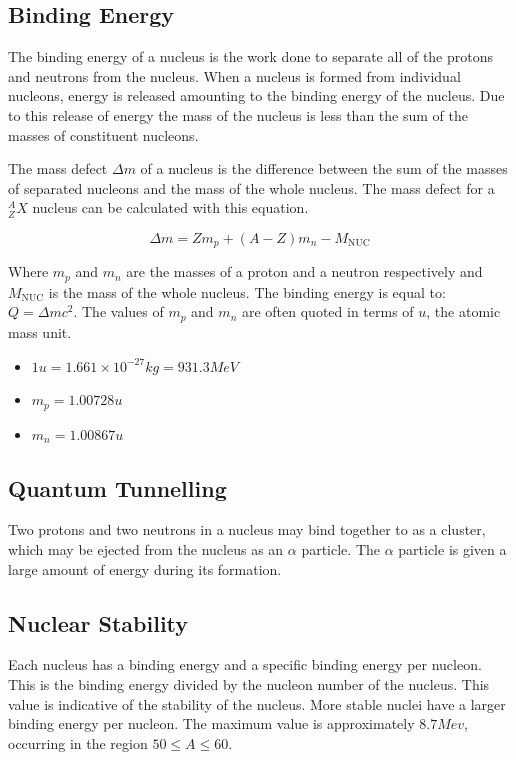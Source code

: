 \documentclass[12pt]{article}
\begin{document}
\subsection{Binding Energy}
\label{sec:org2f78d7e}

The binding energy of a nucleus is the work done to separate all of the protons and neutrons from the nucleus. When a nucleus is formed from individual nucleons, energy is released amounting to the binding energy of the nucleus. Due to this release of energy the mass of the nucleus is less than the sum of the masses of constituent nucleons.

The mass defect \(\Delta m\) of a nucleus is the difference between the sum of the masses of separated nucleons and the mass of the whole nucleus. The mass defect for a \(^A_ZX\) nucleus can be calculated with this equation.

\[\Delta m =  Zm_p + (A-Z)m_n - M_{\text{NUC}} \]

Where \(m_p\) and \(m_n\) are the masses of a proton and a neutron respectively and \(M_{\text{NUC}}\) is the mass of the whole nucleus. The binding energy is equal to: \(Q = \Delta mc^2\). The values of \(m_p\) and \(m_n\) are often quoted in terms of \(u\), the atomic mass unit.

\begin{itemize}
\item \(1u = 1.661 \times 10^{-27}kg= 931.3MeV\)
\item \(m_p = 1.00728u\)
\item \(m_n = 1.00867u\)
\end{itemize}

\subsection{Quantum Tunnelling}
\label{sec:org2341791}

Two protons and two neutrons in a nucleus may bind together to as a cluster, which may be ejected from the nucleus as an \(\alpha\) particle. The \(\alpha\) particle is given a large amount of energy during its formation.

\subsection{Nuclear Stability}
\label{sec:org29464a4}

Each nucleus has a binding energy and a specific binding energy per nucleon. This is the binding energy divided by the nucleon number of the nucleus. This value is indicative of the stability of the nucleus. More stable nuclei have a larger binding energy per nucleon. The maximum value is approximately \(8.7Mev\), occurring in the region \(50 \le A \le 60\).
\end{document}
